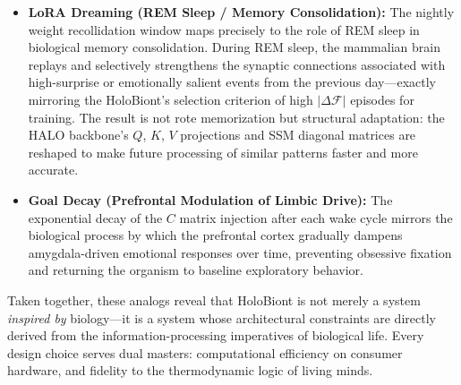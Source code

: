 \begin{itemize}
    \item \textbf{LoRA Dreaming (REM Sleep / Memory Consolidation):} The nightly weight recollidation window maps precisely to the role of REM sleep in biological memory consolidation. During REM sleep, the mammalian brain replays and selectively strengthens the synaptic connections associated with high-surprise or emotionally salient events from the previous day---exactly mirroring the HoloBiont's selection criterion of high $|\Delta\mathcal{F}|$ episodes for training. The result is not rote memorization but structural adaptation: the HALO backbone's $Q$, $K$, $V$ projections and SSM diagonal matrices are reshaped to make future processing of similar patterns faster and more accurate.

    \item \textbf{Goal Decay (Prefrontal Modulation of Limbic Drive):} The exponential decay of the $C$ matrix injection after each wake cycle mirrors the biological process by which the prefrontal cortex gradually dampens amygdala-driven emotional responses over time, preventing obsessive fixation and returning the organism to baseline exploratory behavior.
\end{itemize}

Taken together, these analogs reveal that HoloBiont is not merely a system \textit{inspired by} biology---it is a system whose architectural constraints are directly derived from the information-processing imperatives of biological life. Every design choice serves dual masters: computational efficiency on consumer hardware, and fidelity to the thermodynamic logic of living minds.
